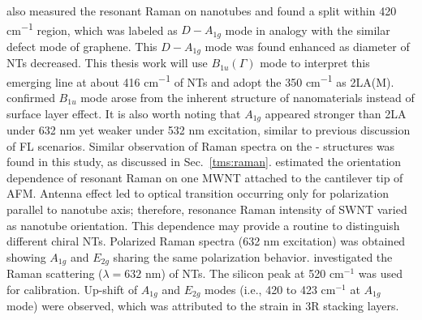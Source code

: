 \citeauthor{Krause2009} also measured the resonant Raman on  nanotubes and found a split within 420 \si{cm^{-1}} region, which was labeled as $D-A_{1g}$ mode in analogy with the similar defect mode of graphene.\cite{Krause2009} This $D-A_{1g}$ mode was found enhanced as diameter of  NTs decreased. This thesis work will use $B_{1u}({\Gamma})$ mode to interpret this emerging line at about 416 \si{cm^{-1}} of  NTs and adopt the 350 \si{cm^{-1}} as 2LA(M). \citeauthor{Krause2009a} confirmed $B_{1u}$ mode arose from the inherent structure of  nanomaterials instead of surface layer effect. It is also worth noting that $A_{1g}$ appeared stronger than 2LA under 632 nm yet weaker under 532 nm excitation, similar to previous discussion of FL scenarios.\cite{Krause2009a} Similar observation of Raman spectra on the - structures was found in this study, as discussed in Sec.~\ref{tms:raman}. \citeauthor{Rafailov2005} estimated the orientation dependence of resonant Raman on one MWNT  attached to the cantilever tip of AFM.\cite{Rafailov2005} Antenna effect led to optical transition occurring only for polarization parallel to nanotube axis; therefore, resonance Raman intensity of SWNT varied as nanotube orientation. This dependence may provide a routine to distinguish different chiral NTs. Polarized Raman spectra (632 nm excitation) was obtained showing $A_{1g}$ and $E_{2g}$ sharing the same polarization behavior. \citeauthor{Virsek2007} investigated the Raman scattering ($\lambda=632$ nm) of  NTs.\cite{Virsek2007} The silicon peak at 520 cm$^{-1}$ was used for calibration. Up-shift of $A_{1g}$ and $E_{2g}$ modes (i.e., 420 to 423 cm$^{-1}$ at $A_{1g}$ mode) were observed, which was attributed to the strain in 3R stacking layers.
